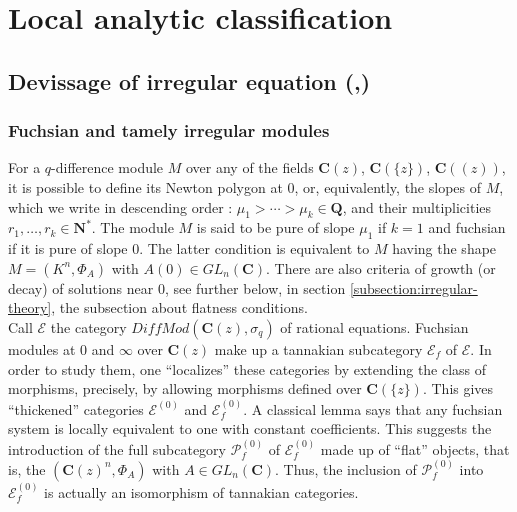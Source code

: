 \documentclass[english]{smfart}
\numberwithin{equation}{thm}
\def\sq{\sigma_q}
\def\C{{\mathbf C}}
\def\Q{{\mathbf Q}}
\def\N{{\mathbf N}}
\def\P{{\mathcal{P}}}
\def\EE{{\mathcal{E}}}
\def\k{{\C(z)}}
\def\Ka{{\C(\{z\})}}
\def\Kf{{\C((z))}}
\begin{document}


\section{Local analytic classification} 
\label{section:classification}


\subsection{Devissage of irregular equation (\cite{JSGAL},\cite{JSFIL})}
\label{subsection:devissage}

\subsubsection*{Fuchsian and tamely irregular modules}

For a $q$-difference module $M$ over any of the fields $\k$, $\Ka$, 
$\Kf$, it is possible to define its Newton polygon at $0$, or, 
equivalently, the slopes of $M$, which we write in descending 
order : $\mu_{1} > \cdots > \mu_{k} \in \Q$, and their
multiplicities $r_{1},\ldots,r_{k} \in \N^{*}$. 
The module $M$ is said to be
pure of slope $\mu_{1}$ if $k = 1$ and fuchsian if it is pure of
slope $0$. The latter condition is equivalent to $M$ having the shape
$M = (K^{n}, \Phi_{A})$ with $A(0) \in GL_{n}(\C)$. There are also 
criteria of growth (or decay) of solutions near $0$, see further below, 
in section \ref{subsection:irregular-theory}, the subsection about 
flatness conditions. \\

Call $\EE$ the category $DiffMod(\k,\sq)$ of rational equations.  
Fuchsian modules at $0$ and $\infty$ over $\k$ make up a tannakian
subcategory $\EE_{f}$ of $\EE$. In order to study them, one ``localizes'' 
these categories by extending the class of morphisms, precisely, by allowing 
morphisms defined over $\Ka$. This gives ``thickened'' categories $\EE^{(0)}$ 
and $\EE_{f}^{(0)}$. A classical lemma says that any fuchsian system 
is locally equivalent to one with constant coefficients. 
This suggests 
the introduction of the full subcategory $\P_{f}^{(0)}$ of $\EE_{f}^{(0)}$ 
made up of ``flat'' objects, that is, the $(\k^{n}, \Phi_{A})$ with 
$A \in GL_{n}(\C)$. Thus, the inclusion of $\P_{f}^{(0)}$ into 
$\EE_{f}^{(0)}$ is actually an isomorphism of tannakian categories. \\
\end{document}
